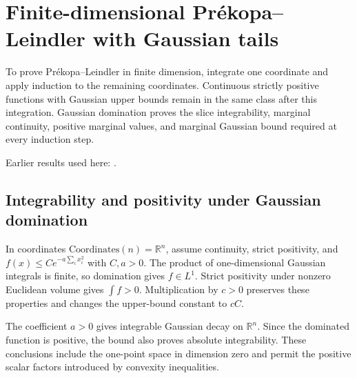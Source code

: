 \documentclass[11pt,a4paper]{report}
\begin{document}
\section{\texorpdfstring{Finite-dimensional Prékopa–Leindler with Gaussian tails}{Finite-dimensional Prékopa–Leindler with Gaussian tails}}
\label{proof-module-IPLA-PrekopaTensorization-lean}


To prove Prékopa–Leindler in finite dimension, integrate one coordinate and apply induction to the remaining coordinates. Continuous strictly positive functions with Gaussian upper bounds remain in the same class after this integration. Gaussian domination proves the slice integrability, marginal continuity, positive marginal values, and marginal Gaussian bound required at every induction step.



Earlier results used here: \cite[Section~3.26]{LangevinLean2026ULASC}.
\subsection{\texorpdfstring{Integrability and positivity under Gaussian domination}{Integrability and positivity under Gaussian domination}}
\label{report-step-IPLA-PrekopaTensorization-lean-1}


In coordinates \(\mathrm{Coordinates}(n)=\mathbb R^n\), assume continuity, strict positivity, and \(f(x)\le Ce^{-a\sum_i x_i^2}\) with \(C,a>0\). The product of one-dimensional Gaussian integrals is finite, so domination gives \(f\in L^1\). Strict positivity under nonzero Euclidean volume gives \(\int f>0\). Multiplication by \(c>0\) preserves these properties and changes the upper-bound constant to \(cC\).



The coefficient \(a>0\) gives integrable Gaussian decay on \(\mathbb R^n\). Since the dominated function is positive, the bound also proves absolute integrability. These conclusions include the one-point space in dimension zero and permit the positive scalar factors introduced by convexity inequalities.
\end{document}
